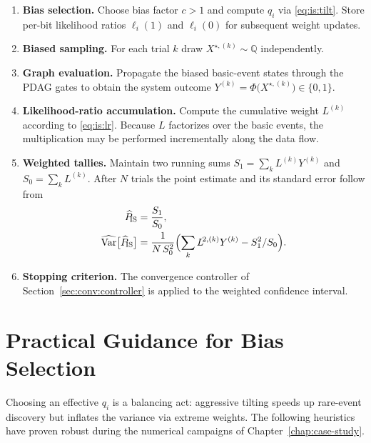 \begin{enumerate}[label=\textbf{Step\,\arabic*},ref=Step~\arabic*]
  \item \textbf{Bias selection.}  Choose bias factor \(c>1\) and compute
        \(q_{i}\) via \eqref{eq:is:tilt}.  Store per-bit likelihood ratios
        \(\ell_{i}(1)\) and \(\ell_{i}(0)\) for subsequent weight updates.
  \item \textbf{Biased sampling.}  For each trial $k$ draw
        $X^{\star,(k)}\sim\mathbb{Q}$ independently.
  \item \textbf{Graph evaluation.}  Propagate the biased basic-event states
        through the PDAG gates to obtain the system outcome
        \(Y^{(k)}=\Phi\bigl(X^{\star,(k)}\bigr)\in\{0,1\}\).
  \item \textbf{Likelihood-ratio accumulation.}  Compute the cumulative weight
        $L^{(k)}$ according to \eqref{eq:is:lr}.  Because $L$ factorizes over
        the basic events, the multiplication may be performed
        incrementally along the data flow.
  \item \textbf{Weighted tallies.}  Maintain two running sums
        \(S_{1}=\sum_{k}L^{(k)}Y^{(k)}\) and
        \(S_{0}=\sum_{k}L^{(k)}\).  After \(N\) trials the point estimate and
        its standard error follow from
        \begin{align}
          \widehat{P}_{\!\text{IS}} &= \frac{S_{1}}{S_{0}}, \\
          \widehat{\operatorname{Var}}\bigl[\widehat{P}_{\!\text{IS}}\bigr]
             &= \frac{1}{N\,S_{0}^{2}}
                \Bigl(\sum_{k} L^{\!2,(k)} Y^{(k)} - S_{1}^{2}/S_{0}\Bigr).
        \end{align}
  \item \textbf{Stopping criterion.}  The convergence controller of
        Section~\ref{sec:conv:controller} is applied to the weighted
        confidence interval.
\end{enumerate}

\section{Practical Guidance for Bias Selection}
\label{sec:is:guidance}

Choosing an effective \(q_{i}\) is a balancing act: aggressive tilting speeds
up rare-event discovery but inflates the variance via extreme weights.  The
following heuristics have proven robust during the numerical campaigns of
Chapter~\ref{chap:case-study}.

